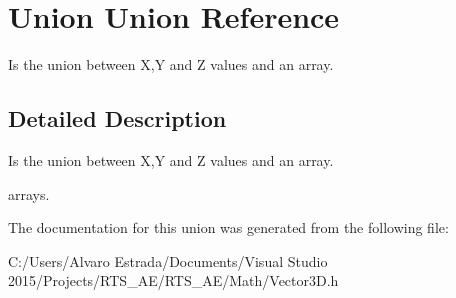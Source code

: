 \hypertarget{union_union}{}\section{Union Union Reference}
\label{union_union}


Is the union between X,Y and Z values and an array.  




\subsection{Detailed Description}
Is the union between X,Y and Z values and an array. 

arrays. 

The documentation for this union was generated from the following file\+:\begin{DoxyCompactItemize}
\item 
C\+:/\+Users/\+Alvaro Estrada/\+Documents/\+Visual Studio 2015/\+Projects/\+R\+T\+S\+\_\+\+A\+E/\+R\+T\+S\+\_\+\+A\+E/\+Math/Vector3\+D.\+h\end{DoxyCompactItemize}
